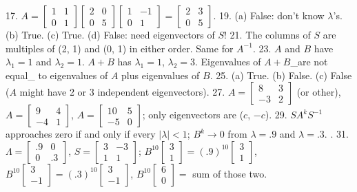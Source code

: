 17. \(A=\begin{bmatrix}1&1\\ 0&1\end{bmatrix}\begin{bmatrix}2&0\\ 0&5\end{bmatrix}\begin{bmatrix}1&-1\\ 0&1\end{bmatrix}=\begin{bmatrix}2&3\\ 0&5\end{bmatrix}\).
19. (a) False: don't know \(\lambda\)'s. (b) True. (c) True. (d) False: need eigenvectors of \(S\)!
21. The columns of \(S\) are multiples of (2, 1) and (0, 1) in either order. Same for \(A^{-1}\).
23. \(A\) and \(B\) have \(\lambda_{1}=1\) and \(\lambda_{2}=1\). \(A+B\) has \(\lambda_{1}=1\), \(\lambda_{2}=3\). Eigenvalues of \(A+B\)_are not equal_ to eigenvalues of \(A\) plus eigenvalues of \(B\).
25. (a) True. (b) False. (c) False (\(A\) might have 2 or 3 independent eigenvectors).
27. \(A=\begin{bmatrix}8&3\\ -3&2\end{bmatrix}\) (or other), \(A=\begin{bmatrix}9&4\\ -4&1\end{bmatrix}\), \(A=\begin{bmatrix}10&5\\ -5&0\end{bmatrix}\); only eigenvectors are (\(c\), \(-c\)).
29. \(SA^{k}S^{-1}\) approaches zero if and only if every \(|\lambda|<1\); \(B^{k}\to 0\) from \(\lambda=.9\) and \(\lambda=.3\). .
31. \(\Lambda=\begin{bmatrix}.9&0\\ 0&.3\end{bmatrix}\), \(S=\begin{bmatrix}3&-3\\ 1&1\end{bmatrix}\); \(B^{10}\begin{bmatrix}3\\ 1\end{bmatrix}=(.9)^{10}\begin{bmatrix}3\\ 1\end{bmatrix}\), \(B^{10}\begin{bmatrix}3\\ -1\end{bmatrix}=(.3)^{10}\begin{bmatrix}3\\ -1\end{bmatrix}\), \(B^{10}\begin{bmatrix}6\\ 0\end{bmatrix}=\) sum of those two.
